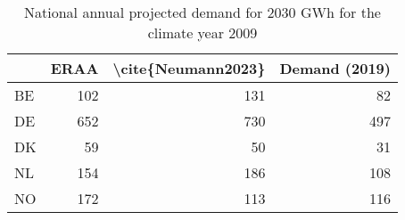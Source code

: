\begin{table}
\centering
\caption{National annual projected demand for 2030  GWh for the climate year 2009}
\begin{tabular}{lrrr}
\toprule
{} &  ERAA &  \textbackslash cite\{Neumann2023\} &  Demand (2019) \\
\midrule
BE &   102 &                 131 &             82 \\
DE &   652 &                 730 &            497 \\
DK &    59 &                  50 &             31 \\
NL &   154 &                 186 &            108 \\
NO &   172 &                 113 &            116 \\
\bottomrule
\end{tabular}
\end{table}
